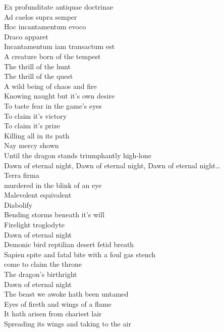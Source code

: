 Ex profunditate antiquae doctrinae \\
Ad caelos supra semper \\
Hoc incantamentum evoco \\
Draco apparet \\
Incantamentum iam transactum est \\

A creature born of the tempest \\
The thrill of the hunt \\
The thrill of the quest \\
A wild being of chaos and fire \\
Knowing naught but it's own desire \\
To taste fear in the game's eyes \\
To claim it's victory \\
To claim it's prize \\
Killing all in its path \\
Nay mercy shown \\
Until the dragon stands triumphantly high-lone \\

Dawn of eternal night, Dawn of eternal night, Dawn of eternal night… \\

Terra firma \\
 murdered in the blink of an eye \\
Malevolent equivalent \\
Diabolify \\
Bending storms beneath it's will \\
Firelight troglodyte \\
Dawn of eternal night \\

Demonic bird reptilian desert fetid breath \\
Sapien spite and fatal bite with a foul gas stench \\
 come to claim the throne \\
The dragon's birthright \\
Dawn of eternal night \\

The beast we awoke hath been untamed \\
Eyes of fireth and wings of a flame \\
It hath arisen from chariest lair \\
Spreading its wings and taking to the air \\

